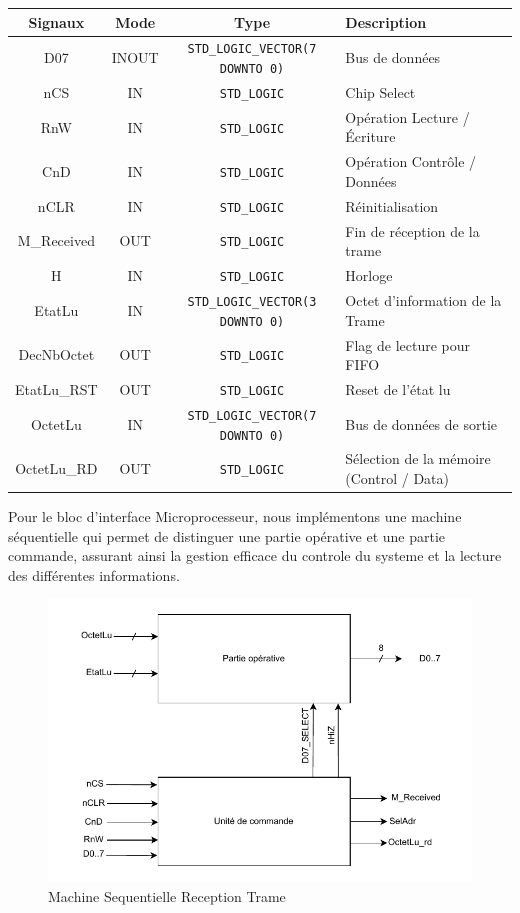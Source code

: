\begin{center}
\renewcommand{\arraystretch}{1.2} %
\small %
    \begin{tabularx}{\textwidth}{|c||c|c|X|}
     \hline		
       \textbf{Signaux} & \textbf{Mode} & \textbf{Type} & \textbf{Description}  \\ \hline 
       D07 & INOUT & \texttt{STD\_LOGIC\_VECTOR(7 DOWNTO 0)} & Bus de données \\
       nCS & IN & \texttt{STD\_LOGIC} & Chip Select \\
       RnW & IN & \texttt{STD\_LOGIC} & Opération Lecture / Écriture \\
       CnD & IN & \texttt{STD\_LOGIC} & Opération Contrôle / Données \\
       nCLR & IN & \texttt{STD\_LOGIC} & Réinitialisation \\
       M\_Received & OUT & \texttt{STD\_LOGIC} & Fin de réception de la trame \\
       H & IN & \texttt{STD\_LOGIC} & Horloge \\
       EtatLu & IN & \texttt{STD\_LOGIC\_VECTOR(3 DOWNTO 0)} & Octet d'information de la Trame \\
       DecNbOctet & OUT & \texttt{STD\_LOGIC} & Flag de lecture pour FIFO \\
       EtatLu\_RST & OUT & \texttt{STD\_LOGIC} & Reset de l'état lu \\
       OctetLu & IN & \texttt{STD\_LOGIC\_VECTOR(7 DOWNTO 0)} & Bus de données de sortie \\
       OctetLu\_RD & OUT & \texttt{STD\_LOGIC} & Sélection de la mémoire (Control / Data) \\
     \hline  
    \end{tabularx}
\end{center}

Pour le bloc d'interface Microprocesseur, nous implémentons une machine séquentielle qui permet 
de distinguer une partie opérative et une partie commande, assurant ainsi la gestion efficace du 
controle du systeme et la lecture des différentes informations.

\begin{figure}[H]
    \centering
    \includegraphics[width=0.8\linewidth]{images/inter/Machine_Seq_Interface_Micro.pdf}
    \caption{Machine Sequentielle Reception Trame}
    \label{fig:placeholder}
\end{figure}

